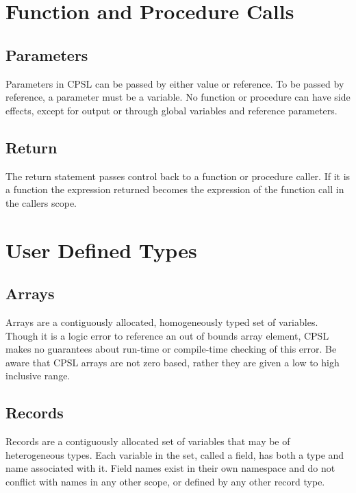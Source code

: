 \documentclass{book}
\begin{document}
\section{Function and Procedure Calls}
\subsection{Parameters}
Parameters in CPSL can be passed by either value or reference. To be passed by
reference, a parameter must be a variable. No function or procedure can have
side effects, except for output or through global variables and reference
parameters.
\subsection{Return}
The return statement passes control back to a function or procedure caller.  If it is a function the expression returned becomes the expression of the function call in the callers scope.
\section{User Defined Types}
\subsection{Arrays}
Arrays are a contiguously allocated, homogeneously typed set of variables.
Though it is a logic error to reference an out of bounds array element, CPSL makes no guarantees about run-time or compile-time checking of this error.
Be aware that CPSL arrays are not zero based, rather they are given a low to high inclusive range.
\subsection{Records}
Records are a contiguously allocated set of variables that may be of heterogeneous types.  Each variable in the set, called a field, has both a type and name associated with it.  Field names exist in their own namespace and do not conflict with names in any other scope, or defined by any other record type.
\end{document}
